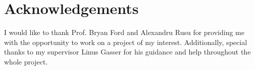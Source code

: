 \section{Acknowledgements}

I would like to thank Prof. Bryan Ford and Alexandru Rusu for
providing me with the opportunity to work on a project of my interest.
\newline
Additionally, special thanks to my supervisor Linus Gasser for his guidance and help throughout the whole project.